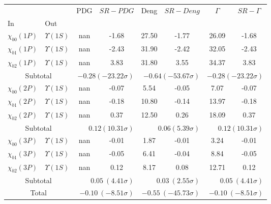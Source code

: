 \begin{tabular}{|l|l|c|c|c|c|c|c|}%
\hline%
&&PDG&$SR-PDG$&Deng&$SR-Deng$&$\Gamma$&$SR-\Gamma$\\%
In&Out&&&&&&\\%
\hline%
$\chi_{b0}(1P)$&$\Upsilon(1S)$&nan&-1.68&27.50&-1.77&26.09&-1.68\\%
$\chi_{b1}(1P)$&$\Upsilon(1S)$&nan&-2.43&31.90&-2.42&32.05&-2.43\\%
$\chi_{b2}(1P)$&$\Upsilon(1S)$&nan&3.83&31.80&3.55&34.37&3.83\\%
\hline%
\hline%
\multicolumn{2}{|c|}{Subtotal}&\multicolumn{2}{|r|}{$-0.28 (-23.22\sigma)$}&\multicolumn{2}{|r|}{$-0.64 (-53.67\sigma)$}&\multicolumn{2}{|r|}{$-0.28 (-23.22\sigma)$}\\%
\hline%
\hline%
$\chi_{b0}(2P)$&$\Upsilon(1S)$&nan&-0.07&5.54&-0.05&7.07&-0.07\\%
$\chi_{b1}(2P)$&$\Upsilon(1S)$&nan&-0.18&10.80&-0.14&13.97&-0.18\\%
$\chi_{b2}(2P)$&$\Upsilon(1S)$&nan&0.37&12.50&0.26&18.09&0.37\\%
\hline%
\hline%
\multicolumn{2}{|c|}{Subtotal}&\multicolumn{2}{|r|}{$0.12 (10.31\sigma)$}&\multicolumn{2}{|r|}{$0.06 (5.39\sigma)$}&\multicolumn{2}{|r|}{$0.12 (10.31\sigma)$}\\%
\hline%
\hline%
$\chi_{b0}(3P)$&$\Upsilon(1S)$&nan&-0.01&1.87&-0.01&3.24&-0.01\\%
$\chi_{b1}(3P)$&$\Upsilon(1S)$&nan&-0.05&6.41&-0.04&8.84&-0.05\\%
$\chi_{b2}(3P)$&$\Upsilon(1S)$&nan&0.12&8.17&0.08&12.71&0.12\\%
\hline%
\hline%
\multicolumn{2}{|c|}{Subtotal}&\multicolumn{2}{|r|}{$0.05~(4.41\sigma)$}&\multicolumn{2}{|r|}{$0.03~(2.55\sigma)$}&\multicolumn{2}{|r|}{$0.05~(4.41\sigma)$}\\%
\hline%
\hline%
\multicolumn{2}{|c|}{Total}&\multicolumn{2}{|r|}{$-0.10~(-8.51\sigma)$}&\multicolumn{2}{|r|}{$-0.55~(-45.73\sigma)$}&\multicolumn{2}{|r|}{$-0.10~(-8.51\sigma)$}\\%
\hline%
\end{tabular}